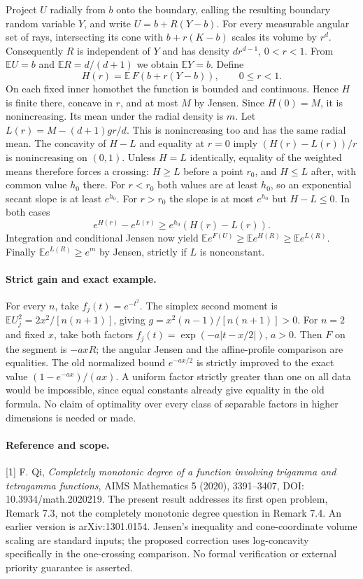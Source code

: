 \documentclass[11pt,a4paper]{article}
\numberwithin{equation}{section}
\theoremstyle{definition}
\theoremstyle{remark}
\begin{document}
Project $U$ radially from $b$ onto the boundary, calling the resulting boundary random variable $Y$, and write $U=b+R(Y-b)$. For every measurable angular set of rays, intersecting its cone with $b+r(K-b)$ scales its volume by $r^d$. Consequently $R$ is independent of $Y$ and has density $d r^{d-1}$, $0<r<1$. From $\mathbb EU=b$ and $\mathbb ER=d/(d+1)$ we obtain $\mathbb E Y=b$. Define
\[
 H(r)=\mathbb E\,F(b+r(Y-b)),\qquad 0\le r<1.
\]
On each fixed inner homothet the function is bounded and continuous. Hence $H$ is finite there, concave in $r$, and at most $M$ by Jensen. Since $H(0)=M$, it is nonincreasing. Its mean under the radial density is $m$. Let $L(r)=M-(d+1)gr/d$. This is nonincreasing too and has the same radial mean. The concavity of $H-L$ and equality at $r=0$ imply $(H(r)-L(r))/r$ is nonincreasing on $(0,1)$. Unless $H=L$ identically, equality of the weighted means therefore forces a crossing: $H\ge L$ before a point $r_0$, and $H\le L$ after, with common value $h_0$ there. For $r<r_0$ both values are at least $h_0$, so an exponential secant slope is at least $e^{h_0}$. For $r>r_0$ the slope is at most $e^{h_0}$ but $H-L\le0$. In both cases
\[
 e^{H(r)}-e^{L(r)}\ge e^{h_0}(H(r)-L(r)).
\]
Integration and conditional Jensen now yield $\mathbb E e^{F(U)}\ge \mathbb E e^{H(R)}\ge\mathbb E e^{L(R)}$. Finally $\mathbb E e^{L(R)}\ge e^m$ by Jensen, strictly if $L$ is nonconstant.

\paragraph{Strict gain and exact example.}
For every $n$, take $f_j(t)=e^{-t^2}$. The simplex second moment is $\mathbb E U_j^2=2x^2/[n(n+1)]$, giving $g=x^2(n-1)/[n(n+1)]>0$. For $n=2$ and fixed $x$, take both factors $f_j(t)=\exp(-a|t-x/2|)$, $a>0$. Then $F$ on the segment is $-axR$; the angular Jensen and the affine-profile comparison are equalities. The old normalized bound $e^{-ax/2}$ is strictly improved to the exact value $(1-e^{-ax})/(ax)$. A uniform factor strictly greater than one on all data would be impossible, since equal constants already give equality in the old formula. No claim of optimality over every class of separable factors in higher dimensions is needed or made.
\paragraph{Reference and scope.} [1] F. Qi, \emph{Completely monotonic degree of a function involving trigamma and tetragamma functions}, AIMS Mathematics 5 (2020), 3391--3407, DOI: 10.3934/math.2020219. The present result addresses its first open problem, Remark 7.3, not the completely monotonic degree question in Remark 7.4. An earlier version is arXiv:1301.0154. Jensen's inequality and cone-coordinate volume scaling are standard inputs; the proposed correction uses log-concavity specifically in the one-crossing comparison. No formal verification or external priority guarantee is asserted.
\end{document}
